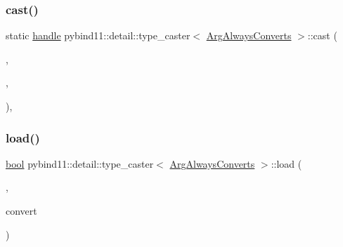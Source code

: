 \subsubsection{\texorpdfstring{cast()}{cast()}}
{\footnotesize\ttfamily static \mbox{\hyperlink{classhandle}{handle}} pybind11\+::detail\+::type\+\_\+caster$<$ \mbox{\hyperlink{class_arg_always_converts}{Arg\+Always\+Converts}} $>$\+::cast (\begin{DoxyParamCaption}\item[{const \mbox{\hyperlink{class_arg_always_converts}{Arg\+Always\+Converts}} \&}]{,  }\item[{\mbox{\hyperlink{detail_2common_8h_adde72ab1fb0dd4b48a5232c349a53841}{return\+\_\+value\+\_\+policy}}}]{,  }\item[{\mbox{\hyperlink{classhandle}{handle}}}]{ }\end{DoxyParamCaption})\hspace{0.3cm}{\ttfamily [inline]}, {\ttfamily [static]}}

\mbox{\label{structpybind11_1_1detail_1_1type__caster_3_01_arg_always_converts_01_4_acce036ef7db0e53a63845fd0099d413c}} 
\subsubsection{\texorpdfstring{load()}{load()}}
{\footnotesize\ttfamily \mbox{\hyperlink{asdl_8h_af6a258d8f3ee5206d682d799316314b1}{bool}} pybind11\+::detail\+::type\+\_\+caster$<$ \mbox{\hyperlink{class_arg_always_converts}{Arg\+Always\+Converts}} $>$\+::load (\begin{DoxyParamCaption}\item[{\mbox{\hyperlink{classhandle}{handle}}}]{,  }\item[{\mbox{\hyperlink{asdl_8h_af6a258d8f3ee5206d682d799316314b1}{bool}}}]{convert }\end{DoxyParamCaption})\hspace{0.3cm}{\ttfamily [inline]}}

\mbox{\label{structpybind11_1_1detail_1_1type__caster_3_01_arg_always_converts_01_4_a9e407d9e0d3f9219ece3bc4d3528d510}} 
